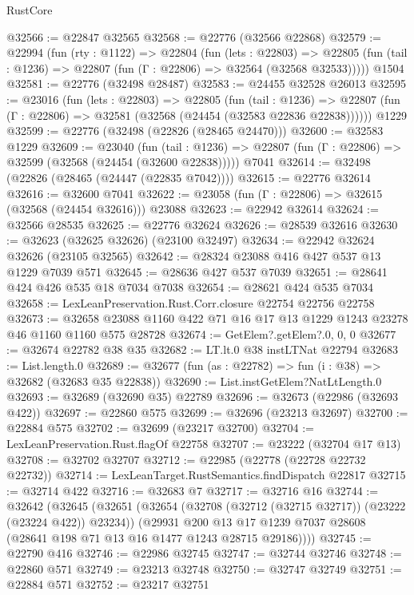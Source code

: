 \begin{lexlean}{RustCore}
\begin{coremodule}
@32566 := @22847 @32565
@32568 := @22776 (@32566 @22868)
@32579 := @22994
    (fun (rty : @1122) =>
    @22804
      (fun (lets : @22803) =>
      @22805 (fun (tail : @1236) => @22807 (fun (Γ : @22806) => @32564 (@32568 @32533)))))
    @1504
@32581 := @22776 (@32498 @28487)
@32583 := @24455 @32528 @26013
@32595 := @23016
    (fun (lets : @22803) =>
    @22805
      (fun (tail : @1236) =>
      @22807 (fun (Γ : @22806) => @32581 (@32568 (@24454 (@32583 @22836 @22838))))))
    @1229
@32599 := @22776 (@32498 (@22826 (@28465 @24470)))
@32600 := @32583 @1229
@32609 := @23040
    (fun (tail : @1236) => @22807 (fun (Γ : @22806) => @32599 (@32568 (@24454 (@32600 @22838)))))
    @7041
@32614 := @32498 (@22826 (@28465 (@24447 (@22835 @7042))))
@32615 := @22776 @32614
@32616 := @32600 @7041
@32622 := @23058 (fun (Γ : @22806) => @32615 (@32568 (@24454 @32616))) @23088
@32623 := @22942 @32614
@32624 := @32566 @28535
@32625 := @22776 @32624
@32626 := @28539 @32616
@32630 := @32623 (@32625 @32626) (@23100 @32497)
@32634 := @22942 @32624 @32626 (@23105 @32565)
@32642 := @28324 @23088 @416 @427 @537 @13 @1229 @7039 @571
@32645 := @28636 @427 @537 @7039
@32651 := @28641 @424 @426 @535 @18 @7034 @7038
@32654 := @28621 @424 @535 @7034
@32658 := LexLeanPreservation.Rust.Corr.closure @22754 @22756 @22758
@32673 := @32658 @23088 @1160 @422 @71 @16 @17 @13 @1229 @1243 @23278 @46 @1160 @1160 @575 @28728
@32674 := GetElem?.getElem?.{0, 0, 0}
@32677 := @32674 @22782 @38 @35
@32682 := LT.lt.{0} @38 instLTNat @22794
@32683 := List.length.{0}
@32689 := @32677 (fun (as : @22782) => fun (i : @38) => @32682 (@32683 @35 @22838))
@32690 := List.instGetElem?NatLtLength.{0}
@32693 := @32689 (@32690 @35) @22789
@32696 := @32673 (@22986 (@32693 @422))
@32697 := @22860 @575
@32699 := @32696 (@23213 @32697)
@32700 := @22884 @575
@32702 := @32699 (@23217 @32700)
@32704 := LexLeanPreservation.Rust.flagOf @22758
@32707 := @23222 (@32704 @17 @13)
@32708 := @32702 @32707
@32712 := @22985 (@22778 (@22728 @22732 @22732))
@32714 := LexLeanTarget.RustSemantics.findDispatch @22817
@32715 := @32714 @422
@32716 := @32683 @7
@32717 := @32716 @16
@32744 := @32642
    (@32645
      (@32651
        (@32654 (@32708 (@32712 (@32715 @32717)) (@23222 (@23224 @422)) @23234))
        (@29931
          @200
          @13
          @17
          @1239
          @7037
          @28608
          (@28641 @198 @71 @13 @16 @1477 @1243 @28715 @29186))))
@32745 := @22790 @416
@32746 := @22986 @32745
@32747 := @32744 @32746
@32748 := @22860 @571
@32749 := @23213 @32748
@32750 := @32747 @32749
@32751 := @22884 @571
@32752 := @23217 @32751

\end{coremodule}
\end{lexlean}
